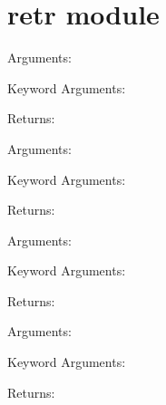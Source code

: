 \documentclass[letterpaper,10pt,english]{sphinxmanual}
\begin{document}
\chapter{retr module}
\label{retr::doc}\label{retr:retr-module}\label{retr:module-retr}

\begin{fulllineitems}
\label{retr:retr.__cellMatrixToString}
Arguments:

Keyword Arguments:

Returns:

\end{fulllineitems}


\begin{fulllineitems}
\label{retr:retr.__cellStringToMatrix}
Arguments:

Keyword Arguments:

Returns:

\end{fulllineitems}


\begin{fulllineitems}
\label{retr:retr.__checkEqualPoint}
Arguments:

Keyword Arguments:

Returns:

\end{fulllineitems}


\begin{fulllineitems}
\label{retr:retr.__conv2PrimVec}
Arguments:

Keyword Arguments:

Returns:

\end{fulllineitems}

\end{document}
